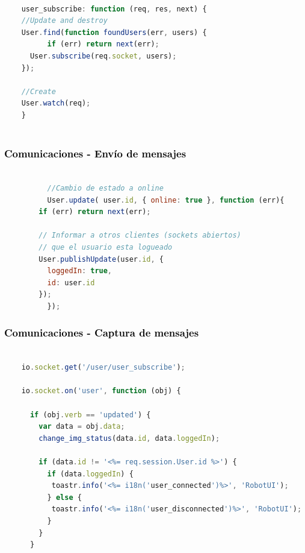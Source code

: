 \documentclass[xcolor=x11names,compress]{beamer}
\theoremstyle{cuadrado}
\begin{document}
{\begin{frame}[fragile]
\begin{adjustwidth}{-2em}{-1em}
  \begin{lstlisting}[language=JavaScript]

    user_subscribe: function (req, res, next) {
	//Update and destroy
	User.find(function foundUsers(err, users) {
          if (err) return next(err);
	  User.subscribe(req.socket, users);
	});

	//Create
	User.watch(req);
    }
    
  \end{lstlisting}
\end{adjustwidth}

\end{frame}



\begin{frame}[fragile]
\frametitle{\textcolor{black}{ Comunicaciones - Envío de mensajes }}


\begin{adjustwidth}{-8em}{-1em}
      \begin{lstlisting}[language=JavaScript]

	      //Cambio de estado a online
	      User.update( user.id, { online: true }, function (err){
		if (err) return next(err);

		// Informar a otros clientes (sockets abiertos) 
		// que el usuario esta logueado
		User.publishUpdate(user.id, {
		  loggedIn: true,
		  id: user.id
		});
	      });

      \end{lstlisting}
\end{adjustwidth}

\end{frame}


\begin{frame}[fragile]
\frametitle{\textcolor{black}{ Comunicaciones - Captura de mensajes }}


\begin{adjustwidth}{-5em}{-1em}
      \begin{lstlisting}[language=JavaScript]

    io.socket.get('/user/user_subscribe');

    io.socket.on('user', function (obj) {

      if (obj.verb == 'updated') {
        var data = obj.data;
        change_img_status(data.id, data.loggedIn);

        if (data.id != '<%= req.session.User.id %>') {
          if (data.loggedIn) {
           toastr.info('<%= i18n('user_connected')%>', 'RobotUI');
          } else {
           toastr.info('<%= i18n('user_disconnected')%>', 'RobotUI');
          }
        }
      }


\end{lstlisting}
\end{adjustwidth}
\end{frame}}
\end{document}
